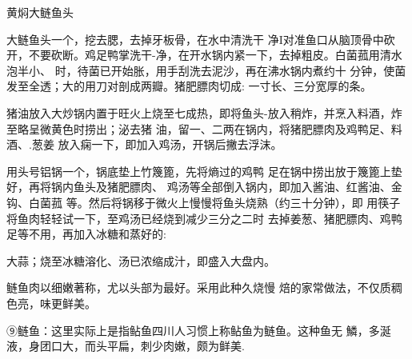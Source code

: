 \begin{recipe}{黄焖大鲢鱼头}

\ingredients









\cooking

\step 大鲢鱼头一个，挖去腮，去掉牙板骨，在水中清洗干 净I对准鱼口从脑顶骨中砍开，不要砍断。鸡足鸭掌洗干-净，在开水锅内紧一下，去掉粗皮。白菌菰用清水泡半小、 时，待菌已开始胀，用手刮洗去泥沙，再在沸水锅内煮约十 分钟，使菌发至全透；大的用刀对剖成两瓣。猪肥膘肉切成: 一寸长、三分宽厚的条。

\step 猪油放入大炒锅内置于旺火上烧至七成热，即将鱼头-放入稍炸，并烹入料酒，炸至略呈微黄色时捞出；泌去猪 油，留一、二两在锅内，将猪肥膘肉及鸡鸭足、料酒、.葱姜 放入痫一下，即加入鸡汤，开锅后撇去浮沫。

\step 用头号铝锅一个，锅底垫上竹篾篦，先将熵过的鸡鸭 足在锅中捞出放于篾篦上垫好，再将锅内鱼头及猪肥膘肉、 鸡汤等全部倒入锅内，即加入酱油、红酱油、金钩、白菌菰 等。然后将锅移于微火上慢慢将鱼头烧熟（约三十分钟），即 用筷子将鱼肉轻轻试一下，至鸡汤已经烧到减少三分之二时 去掉姜葱、猪肥膘肉、鸡鸭足等不用，再加入冰糖和蒸好的:

大蒜；烧至冰糖溶化、汤已浓缩成汁，即盛入大盘内。

\notes

鲢鱼肉以细嫩著称，尤以头部为最好。采用此种久烧慢 焙的家常做法，不仅质稠色亮，味更鲜美。

⑨鲢鱼：这里实际上是指鲇鱼四川人习惯上称鲇鱼为鲢鱼。这种鱼无 鱗，多涎液，身团口大，而头平扁，刺少肉嫩，颇为鲜美.

\end{recipe}

